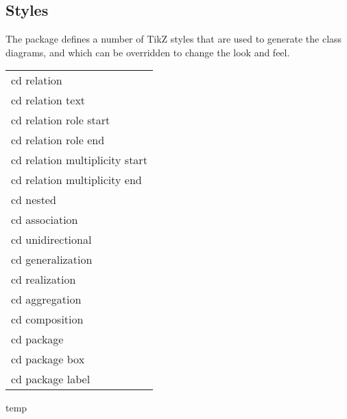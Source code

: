 \documentclass[a4paper,10pt]{article}
\begin{document}
\begin{figure}[H]
  \centering
  
\end{figure}


\subsection{Styles}

The  package defines a number of TikZ styles that are used to generate the class diagrams, and which can be overridden to change the look and feel.

\begin{tabular}{l}
cd relation \\
cd relation text \\
cd relation role start \\
cd relation role end \\
cd relation multiplicity start \\
cd relation multiplicity end \\
cd nested \\
cd association \\
cd unidirectional \\
cd generalization \\
cd realization \\
cd aggregation \\
cd composition \\
cd package \\
cd package box \\
cd package label \\
\end{tabular}

\begin{filecontents*}{temp}
\end{filecontents*}
\end{document}
